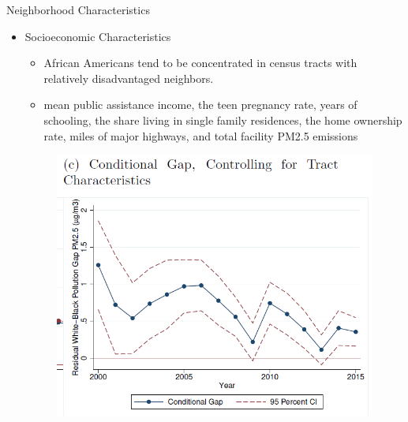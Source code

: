 \documentclass[dvipdfmx,12pt]{beamer}
\begin{document}
\begin{frame}{Neighborhood Characteristics}
  \begin{itemize}
    \item Socioeconomic Characteristics
    \begin{itemize}
      \item African Americans tend to be concentrated in census tracts with relatively disadvantaged neighbors.
      \item mean public assistance income, the teen pregnancy rate, years of schooling, the share living in single family residences, the home ownership rate, miles of major highways, and total facility PM2.5 emissions
    \end{itemize}
    \begin{figure}
      \centering
      \includegraphics[scale = .4]{F3C.png}
    \end{figure}
  \end{itemize}
\end{frame}
\end{document}
